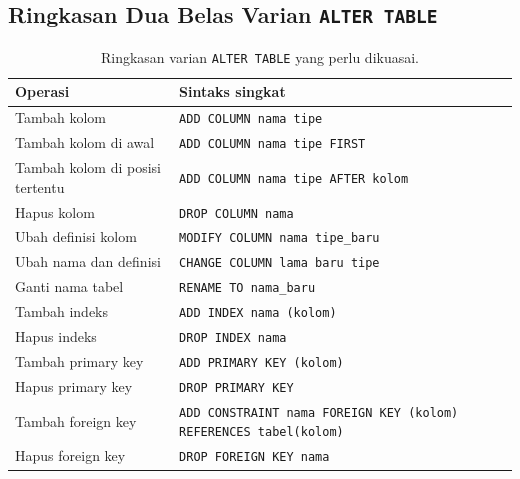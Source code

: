 \documentclass[11pt,a4paper]{article}
\begin{document}
\subsection{Ringkasan Dua Belas Varian \texttt{ALTER TABLE}}

\begin{table}[H]
	\centering
	\caption{Ringkasan varian \texttt{ALTER TABLE} yang perlu dikuasai.}
	\label{tab:alter-variants}
	\footnotesize
	\begin{tabularx}{\textwidth}{l X}
		\toprule
		Operasi                         & Sintaks singkat                                                          \\
		\midrule
		Tambah kolom                    & \texttt{ADD COLUMN nama tipe}                                            \\
		Tambah kolom di awal            & \texttt{ADD COLUMN nama tipe FIRST}                                      \\
		Tambah kolom di posisi tertentu & \texttt{ADD COLUMN nama tipe AFTER kolom}                                \\
		Hapus kolom                     & \texttt{DROP COLUMN nama}                                                \\
		Ubah definisi kolom             & \texttt{MODIFY COLUMN nama tipe\_baru}                                   \\
		Ubah nama dan definisi          & \texttt{CHANGE COLUMN lama baru tipe}                                    \\
		Ganti nama tabel                & \texttt{RENAME TO nama\_baru}                                            \\
		Tambah indeks                   & \texttt{ADD INDEX nama (kolom)}                                          \\
		Hapus indeks                    & \texttt{DROP INDEX nama}                                                 \\
		Tambah primary key              & \texttt{ADD PRIMARY KEY (kolom)}                                         \\
		Hapus primary key               & \texttt{DROP PRIMARY KEY}                                                \\
		Tambah foreign key              & \texttt{ADD CONSTRAINT nama FOREIGN KEY (kolom) REFERENCES tabel(kolom)} \\
		Hapus foreign key               & \texttt{DROP FOREIGN KEY nama}                                           \\
		\bottomrule
	\end{tabularx}
\end{table}
\end{document}
